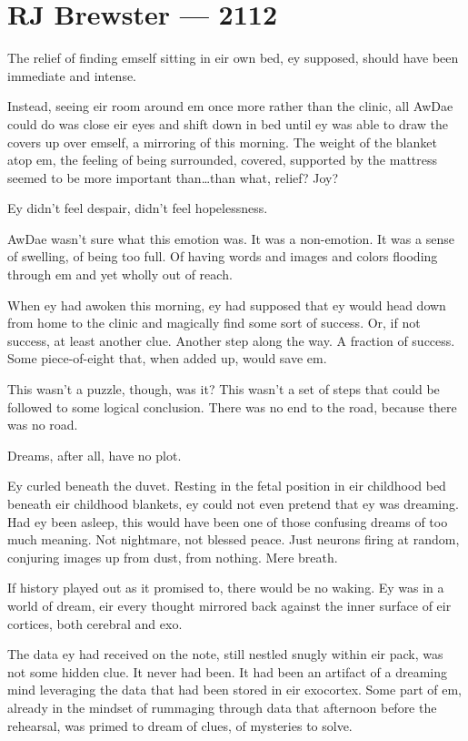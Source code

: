 \hypertarget{rj-brewster-2112}{%
\chapter*{RJ Brewster — 2112}\label{rj-brewster-2112}}

The relief of finding emself sitting in eir own bed, ey supposed, should have been immediate and intense.

Instead, seeing eir room around em once more rather than the clinic, all AwDae could do was close eir eyes and shift down in bed until ey was able to draw the covers up over emself, a mirroring of this morning. The weight of the blanket atop em, the feeling of being surrounded, covered, supported by the mattress seemed to be more important than\ldots{}than what, relief? Joy?

Ey didn't feel despair, didn't feel hopelessness.

AwDae wasn't sure what this emotion was. It was a non-emotion. It was a sense of swelling, of being too full. Of having words and images and colors flooding through em and yet wholly out of reach.

When ey had awoken this morning, ey had supposed that ey would head down from home to the clinic and magically find some sort of success. Or, if not success, at least another clue. Another step along the way. A fraction of success. Some piece-of-eight that, when added up, would save em.

This wasn't a puzzle, though, was it? This wasn't a set of steps that could be followed to some logical conclusion. There was no end to the road, because there was no road.

Dreams, after all, have no plot.

Ey curled beneath the duvet. Resting in the fetal position in eir childhood bed beneath eir childhood blankets, ey could not even pretend that ey was dreaming. Had ey been asleep, this would have been one of those confusing dreams of too much meaning. Not nightmare, not blessed peace. Just neurons firing at random, conjuring images up from dust, from nothing. Mere breath.

If history played out as it promised to, there would be no waking. Ey was in a world of dream, eir every thought mirrored back against the inner surface of eir cortices, both cerebral and exo.

The data ey had received on the note, still nestled snugly within eir pack, was not some hidden clue. It never had been. It had been an artifact of a dreaming mind leveraging the data that had been stored in eir exocortex. Some part of em, already in the mindset of rummaging through data that afternoon before the rehearsal, was primed to dream of clues, of mysteries to solve.


